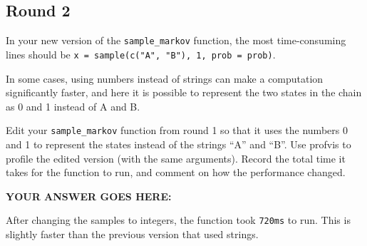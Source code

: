 \documentclass[
]{article}
\begin{document}
\hypertarget{round-2}{%
\subsection{Round 2}\label{round-2}}

In your new version of the \texttt{sample\_markov} function, the most
time-consuming lines should be
\texttt{x\ =\ sample(c("A",\ "B"),\ 1,\ prob\ =\ prob)}.

In some cases, using numbers instead of strings can make a computation
significantly faster, and here it is possible to represent the two
states in the chain as 0 and 1 instead of A and B.

Edit your \texttt{sample\_markov} function from round 1 so that it uses
the numbers 0 and 1 to represent the states instead of the strings ``A''
and ``B''. Use profvis to profile the edited version (with the same
arguments). Record the total time it takes for the function to run, and
comment on how the performance changed.

\textbf{YOUR ANSWER GOES HERE:}

After changing the samples to integers, the function took \texttt{720ms}
to run. This is slightly faster than the previous version that used
strings.
\end{document}
